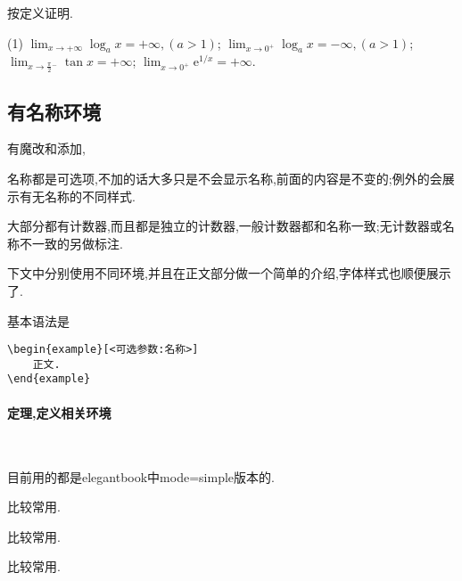 \documentclass[lang=cn,12pt,scheme=chinese,mode=simple,black]{elegantbook}
\begin{document}
\begin{enumerate}
          \begin{resultbox}
              \begin{exercise}[1.3.11]
                  按定义证明.
                  \begin{tasks}[label=(\Roman*)](1)
                      \task $\lim_{x \to +\infty} \log_a x = +\infty, (a > 1)$;
                      \task $\lim_{x \to 0^+} \log_a x = -\infty, (a > 1)$;
                      \task $\lim_{x \to \frac{\pi}{2}{}^- }\tan x = +\infty$;
                      \task $\lim_{x \to 0^+} \mathrm{e}^{1/x} = +\infty$.
                  \end{tasks}
              \end{exercise}
          \end{resultbox}
\end{enumerate}

\subsection{有名称环境}
有魔改和添加,

名称都是可选项,不加的话大多只是不会显示名称,前面的内容是不变的;例外的会展示有无名称的不同样式.

大部分都有计数器,而且都是独立的计数器,一般计数器都和名称一致;无计数器或名称不一致的另做标注.

下文中分别使用不同环境,并且在正文部分做一个简单的介绍,字体样式也顺便展示了.

基本语法是
\setcounter{chapter}{1}
\begin{lstlisting}
\begin{example}[<可选参数:名称>]
    正文.
\end{example}
\end{lstlisting}

\paragraph*{定理,定义相关环境} \

目前用的都是elegantbook中mode=simple版本的.

\begin{theorem}[theorem环境]
    比较常用.
\end{theorem}
\begin{definition}[definition环境]
    比较常用.
\end{definition}

\begin{lemma}[lemma环境]
    比较常用.
\end{lemma}
\end{document}
